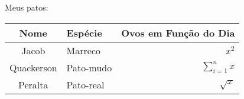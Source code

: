 \documentclass{article}
\begin{document}

Meus patos:

\begin{tabular}[h]{| c | l | r |}
  \hline
  \textbf{Nome} & \textbf{Espécie} & \textbf{Ovos em Função do Dia} \\ \hline
  Jacob         & Marreco          & $x^2$                          \\ \hline
  Quackerson    & Pato-mudo        & $\sum_{i=1}^{n}{x}$            \\ \hline
  Peralta       & Pato-real        & $\sqrt{x}$                     \\
  \hline
\end{tabular}
\end{document}
